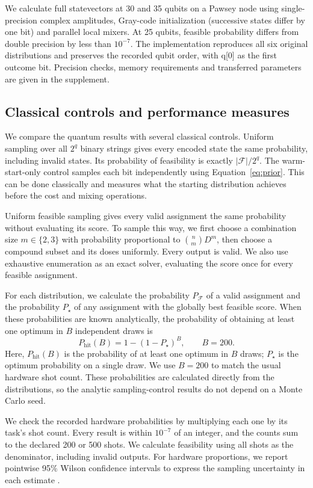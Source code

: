 \documentclass[utf8]{FrontiersinHarvard}
\newcommand{\Fset}{\mathcal{F}}
\begin{document}
We calculate full statevectors at 30 and 35 qubits on a Pawsey node using single-precision complex amplitudes, Gray-code initialization (successive states differ by one bit) and parallel local mixers. At 25 qubits, feasible probability differs from double precision by less than $10^{-7}$. The implementation reproduces all six original distributions and preserves the recorded qubit order, with q[0] as the first outcome bit. Precision checks, memory requirements and transferred parameters are given in the supplement.

\subsection{Classical controls and performance measures}
We compare the quantum results with several classical controls. Uniform sampling over all $2^q$ binary strings gives every encoded state the same probability, including invalid states. Its probability of feasibility is exactly $|\Fset|/2^q$. The warm-start-only control samples each bit independently using Equation~\ref{eq:prior}. This can be done classically and measures what the starting distribution achieves before the cost and mixing operations.

Uniform feasible sampling gives every valid assignment the same probability without evaluating its score. To sample this way, we first choose a combination size $m\in\{2,3\}$ with probability proportional to $\binom{n}{m}D^m$, then choose a compound subset and its doses uniformly. Every output is valid. We also use exhaustive enumeration as an exact solver, evaluating the score once for every feasible assignment.

For each distribution, we calculate the probability $P_{\Fset}$ of a valid assignment and the probability $P_\star$ of any assignment with the globally best feasible score. When these probabilities are known analytically, the probability of obtaining at least one optimum in $B$ independent draws is
\begin{equation}
 P_{\mathrm{hit}}(B)=1-(1-P_\star)^B,\qquad B=200.
 \label{eq:budget}
\end{equation}
Here, $P_{\mathrm{hit}}(B)$ is the probability of at least one optimum in $B$ draws; $P_\star$ is the optimum probability on a single draw. We use $B=200$ to match the usual hardware shot count. These probabilities are calculated directly from the distributions, so the analytic sampling-control results do not depend on a Monte Carlo seed.

We check the recorded hardware probabilities by multiplying each one by its task's shot count. Every result is within $10^{-7}$ of an integer, and the counts sum to the declared 200 or 500 shots. We calculate feasibility using all shots as the denominator, including invalid outputs. For hardware proportions, we report pointwise 95\% Wilson confidence intervals to express the sampling uncertainty in each estimate \citep{wilson1927}.
\end{document}
